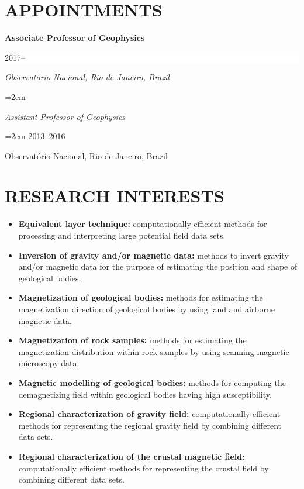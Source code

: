\documentclass[paper=letter,fontsize=11pt]{scrartcl} %
\newcommand{\sepspace}{\vspace*{1em}}		%
\newcommand{\NewPart}[2]{\section*{\uppercase{#1} #2}}
\newcommand{\EducationEntry}[4]{
		\noindent \textbf{#1} \hfill      %
		\colorbox{White}{%
			\parbox{10em}{%
			\hfill\color{Black}#2}} \par  %
		\noindent \textit{#3} \par        %
		\noindent\hangindent=2em\hangafter=0 \small #4 %
		\normalsize \par}
\begin{document}
\NewPart{Appointments}{}



\EducationEntry{Associate Professor of Geophysics}{2017--}
{Observat\'{o}rio Nacional, Rio de Janeiro, Brazil}

\EducationEntry{Assistant Professor of Geophysics}{2013--2016}
{Observat\'{o}rio Nacional, Rio de Janeiro, Brazil}

\sepspace

\NewPart{Research interests}{}

{\begin{itemize}

\item{\textbf{Equivalent layer technique:} computationally efficient methods for processing and interpreting large potential field data sets.}

\item{\textbf{Inversion of gravity and/or magnetic data:} methods to invert gravity and/or magnetic data for the purpose of estimating the position and shape of geological bodies.}

\item{\textbf{Magnetization of geological bodies:} methods for estimating the magnetization direction of geological bodies by using land and airborne magnetic data.}

\item{\textbf{Magnetization of rock samples:} methods for estimating the magnetization distribution within rock samples by using scanning magnetic microscopy data.}

\item{\textbf{Magnetic modelling of geological bodies:} methods for computing the demagnetizing field within geological bodies having high susceptibility.}

\item{\textbf{Regional characterization of gravity field:} computationally efficient methods for representing the regional gravity field by combining different data sets.}

\item{\textbf{Regional characterization of the crustal magnetic field:} computationally efficient methods for representing the crustal field by combining different data sets.}

\end{itemize}}
\end{document}
